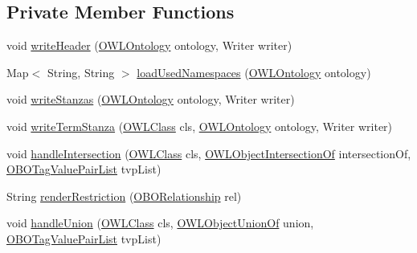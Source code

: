 \subsection*{Private Member Functions}
\begin{DoxyCompactItemize}
\item 
void \hyperlink{classorg_1_1coode_1_1owlapi_1_1obo_1_1renderer_1_1_o_b_o_flat_file_renderer_aa51359ff4331a45bbf0f3b0cf1722136}{write\-Header} (\hyperlink{interfaceorg_1_1semanticweb_1_1owlapi_1_1model_1_1_o_w_l_ontology}{O\-W\-L\-Ontology} ontology, Writer writer)
\item 
Map$<$ String, String $>$ \hyperlink{classorg_1_1coode_1_1owlapi_1_1obo_1_1renderer_1_1_o_b_o_flat_file_renderer_a0fa58d29f1250e0755dad324203280b1}{load\-Used\-Namespaces} (\hyperlink{interfaceorg_1_1semanticweb_1_1owlapi_1_1model_1_1_o_w_l_ontology}{O\-W\-L\-Ontology} ontology)
\item 
void \hyperlink{classorg_1_1coode_1_1owlapi_1_1obo_1_1renderer_1_1_o_b_o_flat_file_renderer_a626fe1848ed92901623f200293947b4f}{write\-Stanzas} (\hyperlink{interfaceorg_1_1semanticweb_1_1owlapi_1_1model_1_1_o_w_l_ontology}{O\-W\-L\-Ontology} ontology, Writer writer)
\item 
void \hyperlink{classorg_1_1coode_1_1owlapi_1_1obo_1_1renderer_1_1_o_b_o_flat_file_renderer_ae66ff9a74c4a355e0d899d0f6357a393}{write\-Term\-Stanza} (\hyperlink{interfaceorg_1_1semanticweb_1_1owlapi_1_1model_1_1_o_w_l_class}{O\-W\-L\-Class} cls, \hyperlink{interfaceorg_1_1semanticweb_1_1owlapi_1_1model_1_1_o_w_l_ontology}{O\-W\-L\-Ontology} ontology, Writer writer)
\item 
void \hyperlink{classorg_1_1coode_1_1owlapi_1_1obo_1_1renderer_1_1_o_b_o_flat_file_renderer_a631f2b47de4495c4d2ed952f29b701d8}{handle\-Intersection} (\hyperlink{interfaceorg_1_1semanticweb_1_1owlapi_1_1model_1_1_o_w_l_class}{O\-W\-L\-Class} cls, \hyperlink{interfaceorg_1_1semanticweb_1_1owlapi_1_1model_1_1_o_w_l_object_intersection_of}{O\-W\-L\-Object\-Intersection\-Of} intersection\-Of, \hyperlink{classorg_1_1coode_1_1owlapi_1_1obo_1_1renderer_1_1_o_b_o_tag_value_pair_list}{O\-B\-O\-Tag\-Value\-Pair\-List} tvp\-List)
\item 
String \hyperlink{classorg_1_1coode_1_1owlapi_1_1obo_1_1renderer_1_1_o_b_o_flat_file_renderer_a2473999db569ac1a5fbb8857921d822e}{render\-Restriction} (\hyperlink{classorg_1_1coode_1_1owlapi_1_1obo_1_1renderer_1_1_o_b_o_relationship}{O\-B\-O\-Relationship} rel)
\item 
void \hyperlink{classorg_1_1coode_1_1owlapi_1_1obo_1_1renderer_1_1_o_b_o_flat_file_renderer_a2aa47e4dcfbeeffe406e69d0b998ef09}{handle\-Union} (\hyperlink{interfaceorg_1_1semanticweb_1_1owlapi_1_1model_1_1_o_w_l_class}{O\-W\-L\-Class} cls, \hyperlink{interfaceorg_1_1semanticweb_1_1owlapi_1_1model_1_1_o_w_l_object_union_of}{O\-W\-L\-Object\-Union\-Of} union, \hyperlink{classorg_1_1coode_1_1owlapi_1_1obo_1_1renderer_1_1_o_b_o_tag_value_pair_list}{O\-B\-O\-Tag\-Value\-Pair\-List} tvp\-List)

\end{DoxyCompactItemize}

